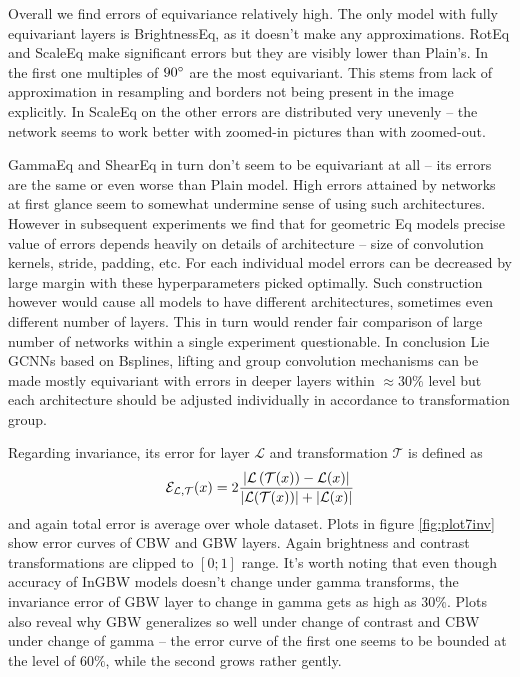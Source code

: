     Overall we find errors of equivariance relatively high. The only
    model with
    fully equivariant layers is BrightnessEq, as it doesn't make any
    approximations. RotEq and ScaleEq make significant errors but they are
    visibly lower than Plain's. In the first one multiples of $90 \degree$ are
    the most equivariant. This stems from lack of approximation in resampling
    and borders not being present in the image explicitly. In ScaleEq
    on the other errors are distributed very unevenly -- the network seems to
    work better with zoomed-in pictures than with zoomed-out.

    GammaEq and ShearEq in turn don't seem to be equivariant
    at all -- its errors are the same or even worse
    than Plain model. High errors attained by networks at first glance seem to
    somewhat undermine sense of using such architectures.
    However
    in subsequent experiments we find that for geometric Eq models
    precise value of errors
    depends heavily on details of architecture -- size of convolution
    kernels, stride, padding, etc. For each individual model errors can
    be decreased by large margin with these hyperparameters picked
    optimally. Such construction however would cause all models to have different
    architectures, sometimes even different number of layers.
    This in
    turn would render fair comparison of large number of networks within
    a single experiment questionable.
    In conclusion Lie GCNNs based on Bsplines, lifting and group
    convolution mechanisms
    can be made mostly equivariant with errors in deeper layers within $\approx
    30\%$ level but each architecture should be adjusted individually in
    accordance to transformation group.

    Regarding invariance, its error for layer $\mathcal{L}$
    and transformation $\mathcal{T}$ is defined as
    $$ \mathcal{E}_{\mathcal{L},\mathcal{T}}(x) = 2\frac{\left|\mathcal{L}\left(\mathcal{T}(x)\right) -
    \mathcal{L}(x)\right|}
    {\left|\mathcal{L}(\mathcal{T}(x))\right| + \left|\mathcal{L}(x)\right|} $$
    and again total error is average over whole dataset.
    Plots in figure \ref{fig:plot7inv} show error curves of CBW and GBW layers.
    Again brightness and contrast transformations are clipped to $[0;1]$ range.
    It's worth noting that even though accuracy of InGBW models doesn't change
    under gamma transforms, the invariance error of GBW layer to change in gamma
    gets as high as $30\%$. Plots also reveal why GBW generalizes so well under
    change of contrast and CBW under change of gamma -- the error curve of the
    first one seems to be bounded at the level of $60\%$, while the second grows
    rather gently.

